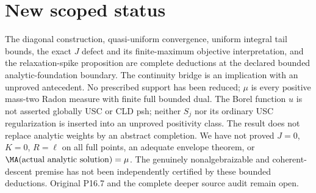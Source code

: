 \section{New scoped status}
The diagonal construction, quasi-uniform convergence, uniform integral
tail bounds, the exact $J$ defect and its finite-maximum objective
interpretation, and the relaxation-spike proposition are complete
deductions at the declared bounded analytic-foundation boundary.
The continuity bridge is an implication with an unproved antecedent.
No prescribed support has been reduced; $\mu$ is every positive
mass-two Radon measure with finite full bounded dual.
The Borel function $u$ is not asserted globally USC or CLD psh;
neither $S_j$ nor its ordinary USC regularization is inserted into an
unproved positivity class. The result does not replace analytic
weights by an abstract completion. We have not proved $J=0$, $K=0$,
$R=\ell$ on all full points, an adequate envelope theorem, or
$\MA(\text{actual analytic solution})=\mu$.
The genuinely nonalgebraizable and coherent-descent premise has not
been independently certified by these bounded deductions.
Original P16.7 and the complete deeper source audit remain open.
